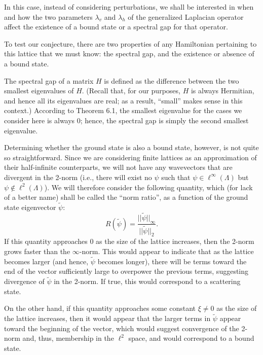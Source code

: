 \documentclass{article}
\numberwithin{equation}{section}
\numberwithin{theorem}{section}
\numberwithin{proposition}{section}
\numberwithin{lemma}{section}
\numberwithin{corollary}{section}
\numberwithin{definition}{section}
\begin{document}
In this case, instead of considering perturbations, we shall be interested in when and how the two parameters $\lambda_v$ and $\lambda_h$ of the generalized Laplacian operator affect the existence of a bound state or a spectral gap for that operator.

To test our conjecture, there are two properties of any Hamiltonian pertaining to this lattice that we must know: the spectral gap, and the existence or absence of a bound state.

The spectral gap of a matrix $H$ is defined as the difference between the two smallest eigenvalues of $H$. (Recall that, for our purposes, $H$ is always Hermitian, and hence all its eigenvalues are real; as a result, ``small'' makes sense in this context.) According to Theorem 6.1, the smallest eigenvalue for the cases we consider here is always $0$; hence, the spectral gap is simply the second smallest eigenvalue.

Determining whether the ground state is also a bound state, however, is not quite so straightforward. Since we are considering finite lattices as an approximation of their half-infinite counterparts, we will not have any wavevectors that are divergent in the 2-norm (i.e., there will exist no $\psi$ such that $\psi \in \ell^\infty(\Lambda)$ but $\psi \notin \ell^2(\Lambda)$). We will therefore consider the following quantity, which (for lack of a better name) shall be called the ``norm ratio'', as a function of the ground state eigenvector $\widetilde{\psi}$:
\begin{equation}
\label{normration}
R(\widetilde{\psi}) = \frac{||\widetilde{\psi}||_\infty}{||\widetilde{\psi}||_2}.
\end{equation}
If this quantity approaches $0$ as the size of the lattice increases, then the 2-norm grows faster than the $\infty$-norm. This would appear to indicate that as the lattice becomes larger (and hence, $\widetilde{\psi}$ becomes longer), there will be terms toward the end of the vector sufficiently large to overpower the previous terms, suggesting divergence of $\widetilde{\psi}$ in the 2-norm. If true, this would correspond to a scattering state.

On the other hand, if this quantity approaches some constant $\xi \neq 0$ as the size of the lattice increases, then it would appear that the larger terms in $\widetilde{\psi}$ appear toward the beginning of the vector, which would suggest convergence of the 2-norm and, thus, membership in the $\ell^2$ space, and would correspond to a bound state.
\end{document}
